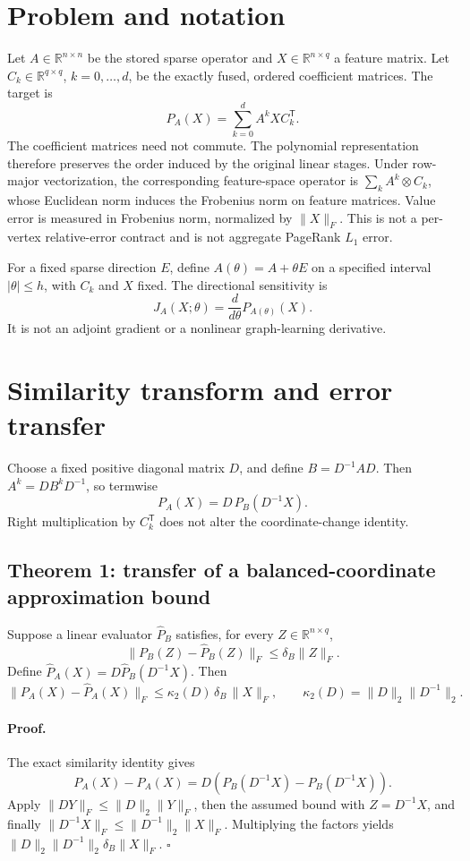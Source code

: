 \documentclass[10pt]{article}
\begin{document}
\section{Problem and notation}

Let $A\in\mathbb{R}^{n\times n}$ be the stored sparse operator and $X\in\mathbb{R}^{n\times q}$ a feature matrix. Let $C_k\in\mathbb{R}^{q\times q}$, $k=0,\ldots,d$, be the exactly fused, ordered coefficient matrices. The target is
\[
P_A(X)=\sum_{k=0}^{d} A^k X C_k^{\mathsf T}.
\]
The coefficient matrices need not commute. The polynomial representation therefore preserves the order induced by the original linear stages. Under row-major vectorization, the corresponding feature-space operator is $\sum_k A^k\otimes C_k$, whose Euclidean norm induces the Frobenius norm on feature matrices. Value error is measured in Frobenius norm, normalized by $\|X\|_F$. This is not a per-vertex relative-error contract and is not aggregate PageRank $L_1$ error.

For a fixed sparse direction $E$, define $A(\theta)=A+\theta E$ on a specified interval $|\theta|\le h$, with $C_k$ and $X$ fixed. The directional sensitivity is
\[
J_A(X;\theta)=\frac{d}{d\theta}P_{A(\theta)}(X).
\]
It is not an adjoint gradient or a nonlinear graph-learning derivative.

\section{Similarity transform and error transfer}

Choose a fixed positive diagonal matrix $D$, and define $B=D^{-1}AD$. Then $A^k=DB^kD^{-1}$, so termwise
\[
P_A(X)=D\,P_B(D^{-1}X).
\]
Right multiplication by $C_k^{\mathsf T}$ does not alter the coordinate-change identity.

\subsection{Theorem 1: transfer of a balanced-coordinate approximation bound}

Suppose a linear evaluator $\widehat P_B$ satisfies, for every $Z\in\mathbb{R}^{n\times q}$,
\[
\|P_B(Z)-\widehat P_B(Z)\|_F\le \delta_B\|Z\|_F.
\]
Define $\widehat P_A(X)=D\widehat P_B(D^{-1}X)$. Then
\[
\|P_A(X)-\widehat P_A(X)\|_F
\le \kappa_2(D)\,\delta_B\,\|X\|_F,\qquad
\kappa_2(D)=\|D\|_2\|D^{-1}\|_2.
\]

\paragraph{Proof.}
The exact similarity identity gives
\[
P_A(X)-\widehat P_A(X)
=D\left(P_B(D^{-1}X)-\widehat P_B(D^{-1}X)\right).
\]
Apply $\|DY\|_F\le\|D\|_2\|Y\|_F$, then the assumed bound with $Z=D^{-1}X$, and finally $\|D^{-1}X\|_F\le\|D^{-1}\|_2\|X\|_F$. Multiplying the factors yields $\|D\|_2\|D^{-1}\|_2\delta_B\|X\|_F$. \hfill$\square$
\end{document}
